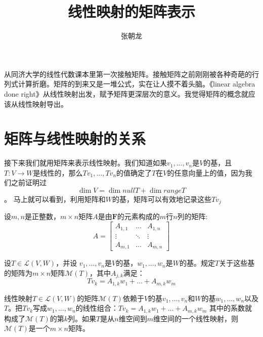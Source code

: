 \documentclass[10pt,a4paper,UTF8]{article}
\author{张朝龙}
\date{}
\title{线性映射的矩阵表示}
\begin{document}
\maketitle
\tableofcontents
{}
\newpage

从同济大学的线性代数课本里第一次接触矩阵。接触矩阵之前刚刚被各种奇葩的行列式计算折磨。矩阵的到来又是一堆公式，实在让人摸不着头脑。《linear algebra done right》从线性映射出发，赋予矩阵更深层次的意义。我觉得矩阵的概念就应该从线性映射导出。

\section{矩阵与线性映射的关系}
\label{sec:org3384256}


接下来我们就用矩阵来表示线性映射。我们知道如果\(v_{1},\ldots ,v_{n}\)是\(V\)的基，且\(T:V\rightarrow W\)是线性的，那么\(Tv_{1},\ldots ,Tv_{n}\)的值确定了\(T\)在\(V\)的任意向量上的值，因为我们之前证明过 \[\dim V = \dim nullT + \dim range T\]。
马上就可以看到，利用矩阵和\(W\)的基，矩阵可以有效地记录这些\(Tv_{j}\)

\begin{definition}
设\(m,n\)是正整数，\(m\times n\)矩阵\(A\)是由\(\mathbf{F}\)的元素构成的\(m\)行\(n\)列的矩阵:
\begin{equation}
\label{eq:2}
A=
\begin{bmatrix}
A_{1,1} & \ldots & A_{1,n} \\
\vdots  & \ddots & \vdots \\
A_{m,1} & \ldots & A_{m,n}
\end{bmatrix}
\end{equation}
\end{definition}
\begin{definition}
设\(T\in \mathcal{L}(V,W)\)，并设 \(v_{1},\ldots ,v_{n}\)是\(V\)的基，\(w_{1},\ldots ,w_{n}\)是\(W\)的基。规定\(T\)关于这些基的矩阵为\(m\times n\)矩阵\(\mathcal{M}(T)\)，其中\(A_{j,k}\)满足：
\[Tv_{k} = A_{1,k}w_{1} + \ldots + A_{m,k}w_{m}\]
\end{definition}
线性映射\(T\in \mathcal{L}(V,W)\)的矩阵\(\mathcal{M}(T)\)依赖于\(V\)的基\(v_{1},\ldots ,v_{n}\)和\(W\)的基\(w_{1},\ldots ,w_{n}\)以及\(T\)。把\(Tv_{k}\)写成\(w_{1},\ldots ,w_{n}\)的线性组合：\(Tv_{k} = A_{1,k}w_{1} + \ldots + A_{m,k}w_{m}\) 其中的系数就构成了\(\mathcal{M}(T)\)的第\(k\)列。如果\(T\)是从\(n\)维空间到\(m\)维空间的一个线性映射，则\(\mathcal{M}(T)\)是一个\(m\times n\)矩阵。
\end{document}
